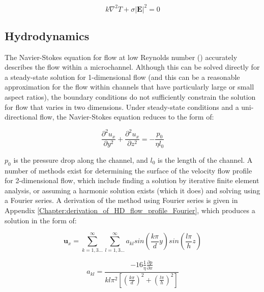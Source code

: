 \begin{equation}
 k \nabla^{2} T + \sigma \left| \textbf{E} \right| ^{2} = 0
\label{eqn:thermal_energy_balance_reduced}
\end{equation}

\subsection{Hydrodynamics}

The Navier-Stokes equation for flow at low Reynolds number () accurately describes the flow within a microchannel. Although this can be solved directly for a steady-state solution for 1-dimensional flow (and this can be a reasonable approximation for the flow within channels that have particularly large or small aspect ratios), the boundary conditions do not sufficiently constrain the solution for flow that varies in two dimensions. Under steady-state conditions and a uni-directional flow, the Navier-Stokes equation reduces to the form of:

\begin{equation}
 \frac{\partial^{2}u_{x}}{\partial y^{2}} + \frac{\partial^{2}u_{x}}{\partial z^{2}} = - \frac {p_{0}} {\eta l_{0}}
\label{eqn:2d_steady_state_navier_stokes}
\end{equation}

$p_{0}$ is the pressure drop along the channel, and $l_{0}$ is the length of the channel. A number of methods exist for determining the surface of the velocity flow profile for 2-dimensional flow, which include finding a solution by iterative finite element analysis, or assuming a harmonic solution exists (which it does) and solving using a Fourier series. A derivation of the method using Fourier series is given in Appendix \ref{Chapter:derivation_of_HD_flow_profile_Fourier}, which produces a solution in the form of:

\begin{equation}
 \textbf{u}_{x} = \sum_{k=1,3...}^{\infty}\sum_{l=1,3...}^{\infty} a_{kl} sin\left(\frac{k \pi}{d}y\right)sin\left(\frac{l \pi}{h}z\right)
\label{eqn:fourier_solution_navier_stokes1}
\end{equation}

\begin{equation}
 a_{kl} = \frac{-16\tfrac{1}{\eta}\tfrac{\partial p}{\partial x}}{kl \pi^{2} \left [ \left ( \frac{k \pi}{d} \right )^{2} + \left ( \frac{l \pi}{h} \right )^{2} \right ]}
\label{eqn:fourier_solution_navier_stokes2}
\end{equation}


